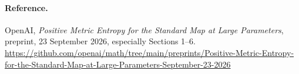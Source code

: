\documentclass[11pt,a4paper]{article}
\begin{document}
\paragraph{Reference.} OpenAI, \emph{Positive Metric Entropy for the Standard Map at Large Parameters}, preprint, 23 September 2026, especially Sections 1--6.\newline
\url{https://github.com/openai/math/tree/main/preprints/Positive-Metric-Entropy-for-the-Standard-Map-at-Large-Parameters-September-23-2026}
\end{document}
